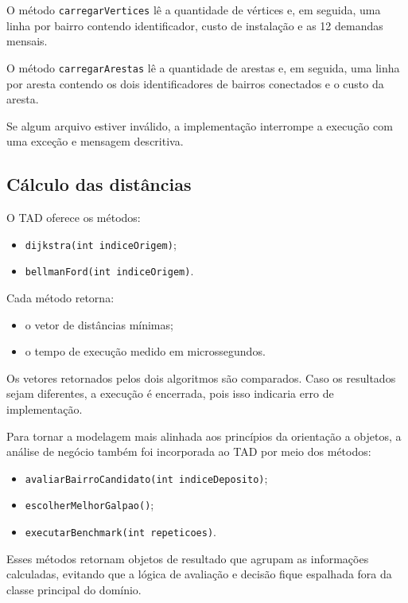 \documentclass[12pt,a4paper]{article}
\begin{document}
O método \texttt{carregarVertices} lê a quantidade de vértices e, em seguida,
uma linha por bairro contendo identificador, custo de instalação e as 12
demandas mensais.

O método \texttt{carregarArestas} lê a quantidade de arestas e, em seguida, uma
linha por aresta contendo os dois identificadores de bairros conectados e o
custo da aresta.

Se algum arquivo estiver inválido, a implementação interrompe a execução com
uma exceção e mensagem descritiva.

\subsection{Cálculo das distâncias}

O TAD oferece os métodos:

\begin{itemize}[noitemsep]
    \item \texttt{dijkstra(int indiceOrigem)};
    \item \texttt{bellmanFord(int indiceOrigem)}.
\end{itemize}

Cada método retorna:

\begin{itemize}[noitemsep]
    \item o vetor de distâncias mínimas;
    \item o tempo de execução medido em microssegundos.
\end{itemize}

Os vetores retornados pelos dois algoritmos são comparados. Caso os resultados
sejam diferentes, a execução é encerrada, pois isso indicaria erro de
implementação.

Para tornar a modelagem mais alinhada aos princípios da orientação a objetos, a
análise de negócio também foi incorporada ao TAD por meio dos métodos:

\begin{itemize}[noitemsep]
    \item \texttt{avaliarBairroCandidato(int indiceDeposito)};
    \item \texttt{escolherMelhorGalpao()};
    \item \texttt{executarBenchmark(int repeticoes)}.
\end{itemize}

Esses métodos retornam objetos de resultado que agrupam as informações
calculadas, evitando que a lógica de avaliação e decisão fique espalhada fora
da classe principal do domínio.
\end{document}
